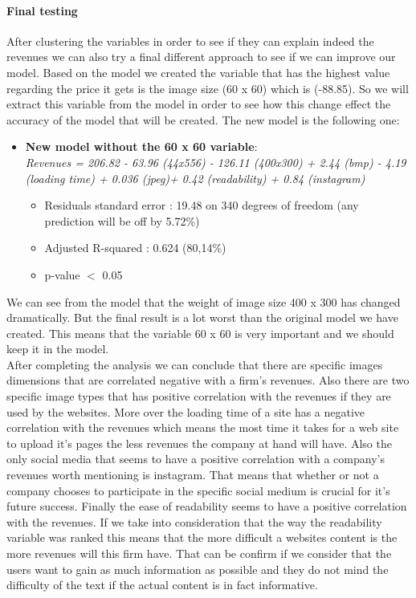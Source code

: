 \documentclass{article}
\begin{document}
\paragraph{Final testing}
After clustering the variables in order to see if they can explain indeed the revenues we can also try a final different approach to see if we can improve our model. Based on the model we created the variable that has the highest value regarding the price it gets is the image size (60 x 60) which is (-88.85). So we will extract this variable from the model in order to see how this change effect the accuracy of the model that will be created. The new model is the following one:
\begin{itemize}
\item \textbf{New model without the 60 x 60 variable}:\\
\textit{Revenues = 206.82 - 63.96 (44x556) - 126.11 (400x300) + 2.44 (bmp) - 4.19 (loading time) + 0.036 (jpeg)+ 0.42 (readability) + 0.84 (instagram) }
\begin{itemize}
\item Residuals standard error : 19.48 on 340 degrees of freedom (any prediction will be off by 5.72\%)
\item Adjusted R-squared : 0.624 (80,14\%)
\item p-value $<$ 0.05
\end{itemize}
\end{itemize}
We can see from the model that the weight of image size 400 x 300 has changed dramatically. But the final result is a lot worst than the original model we have created. This means that the variable 60 x 60 is very important and we should keep it in the model.\\
After completing the analysis we can conclude that there are specific images dimensions that are correlated negative with a firm's revenues. Also there are two specific image types that has positive correlation with the revenues if they are used by the websites. More over the loading time of a site has a negative correlation with the revenues which means the most time it takes for a web site to upload it's pages the less revenues the company at hand will have. Also the only social media that seems to have a positive correlation with a company's revenues worth mentioning is instagram. That means that whether or not a company chooses to participate in the specific social medium is crucial for it's future success. Finally the ease of readability seems to have a positive correlation with the revenues. If we take into consideration that the way the readability variable was ranked this means that the more difficult a websites content is the more revenues will this firm have. That can be confirm if we consider that the users want to gain as much information as possible and they do not mind the difficulty of the text if the actual content is in fact informative.
\pagebreak  
\end{document}
